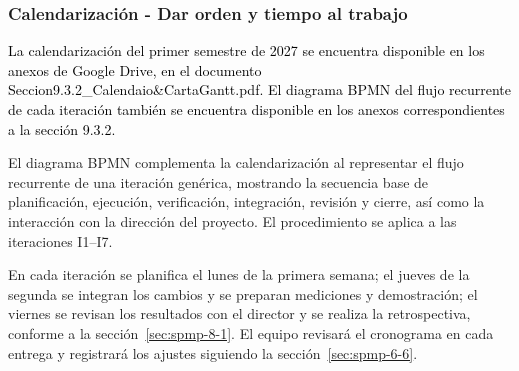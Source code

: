 
\subsubsection{Calendarización - Dar orden y tiempo al trabajo}\label{sec:spmp-9-3-2}

\textcolor{black}{La calendarización del primer semestre de 2027 se encuentra disponible en los anexos de Google Drive, en el documento \textcolor{black}{Seccion9.3.2\_Calendaio\&CartaGantt.pdf}. El diagrama BPMN del flujo recurrente de cada iteración también se encuentra disponible en los anexos correspondientes a la sección 9.3.2.}

El diagrama BPMN complementa la calendarización al representar el flujo recurrente de una iteración genérica, mostrando la secuencia base de planificación, ejecución, verificación, integración, revisión y cierre, así como la interacción con la dirección del proyecto. El procedimiento se aplica a las iteraciones I1--I7.

En cada iteración se planifica el lunes de la primera semana; el jueves de la segunda se integran los cambios y se preparan mediciones y demostración; el viernes se revisan los resultados con el director y se realiza la retrospectiva, conforme a la sección~\ref{sec:spmp-8-1}. El equipo revisará el cronograma en cada entrega y registrará los ajustes siguiendo la sección~\ref{sec:spmp-6-6}.
